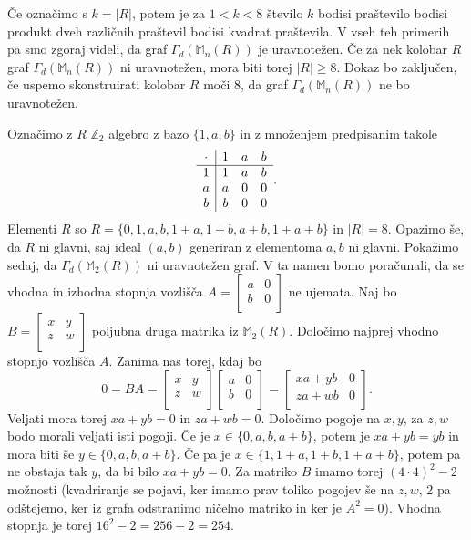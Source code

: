 \documentclass[a4paper, 12pt]{amsart}
\theoremstyle{definition} %
\theoremstyle{plain} %
\newcommand{\Z}{\mathbb Z}
\newcommand{\M}{\mathbb M}
\begin{document}
Če označimo s $k=|R|$, potem je za $1<k<8$ število $k$ bodisi praštevilo bodisi produkt dveh različnih praštevil bodisi kvadrat praštevila. V vseh teh primerih pa smo zgoraj videli, da graf $\Gamma_d(\M_n(R))$ je uravnotežen. Če za nek kolobar $R$ graf $\Gamma_d(\M_n(R))$ ni uravnotežen, mora biti torej $|R|\ge 8$. Dokaz bo zaključen, če uspemo skonstruirati kolobar $R$  moči 8, da graf $\Gamma_d(\M_n(R))$ ne bo uravnotežen.

Označimo z $R$ $\Z_2$ algebro z bazo $\{1,a,b\}$ in z množenjem predpisanim takole
$$
\begin{array}{c | ccc}
\cdot & 1 & a & b \\
\hline
1 & 1 & a & b \\
a & a & 0 & 0 \\
b & b & 0 & 0 \\
\end{array}.
$$
Elementi $R$ so $R=\{0,1,a,b,1+a,1+b,a+b,1+a+b\}$ in $|R|=8$. Opazimo še, da $R$ ni glavni, saj ideal  $(a,b)$ generiran z elementoma $a,b$ ni glavni. Pokažimo sedaj, da $\Gamma_d(\M_2(R))$ ni uravnotežen graf. V ta namen bomo poračunali, da se vhodna  in izhodna stopnja vozlišča 
$A=
\begin{bmatrix}
a & 0 \\
b & 0 \\
\end{bmatrix}
$ ne ujemata.
Naj bo $B=
\begin{bmatrix}
x & y \\
z & w \\
\end{bmatrix}
$
poljubna druga matrika iz $\M_2(R)$. Določimo najprej vhodno stopnjo vozlišča $A$. Zanima nas torej, kdaj bo
$$
0=BA = \begin{bmatrix}
x & y \\
z & w \\
\end{bmatrix}
\begin{bmatrix}
a & 0 \\
b & 0 \\
\end{bmatrix}
=
\begin{bmatrix}
xa + yb & 0 \\
za + wb & 0 \\
\end{bmatrix}.
$$
Veljati mora torej $xa + yb = 0 $ in $za+wb = 0$. Določimo pogoje na $x,y$, za $z,w$ bodo morali veljati isti pogoji. Če je $x\in \{0,a,b,a+b\}$, potem je $xa + yb = yb$ in mora biti še $y\in \{0,a,b,a+b\}$. Če pa je $x\in \{1,1+a,1+b,1+a+b\}$, potem pa ne obstaja tak $y$, da bi bilo $xa+yb=0$. Za matriko $B$ imamo torej $(4\cdot 4)^2 -2$ možnosti (kvadriranje se pojavi, ker imamo prav toliko pogojev še na $z,w$, 2 pa odštejemo, ker iz grafa odstranimo ničelno matriko in ker je $A^2 = 0$). Vhodna stopnja je torej $16^2 - 2= 256-2 = 254$. 
\end{document}
